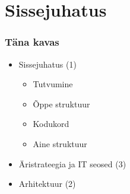 








\maketitle

\section{Sissejuhatus}
\begin{frame}[fragile]
  \frametitle{Täna kavas}
\begin{itemize}
	\item Sissejuhatus (1)
	\begin{itemize}
		\item Tutvumine
		\item Õppe struktuur
		\item Kodukord
		\item Aine struktuur
	\end{itemize}
	\item Äristrateegia ja IT seosed (3)
	\item Arhitektuur (2)
\end{itemize}
	
\end{frame}

